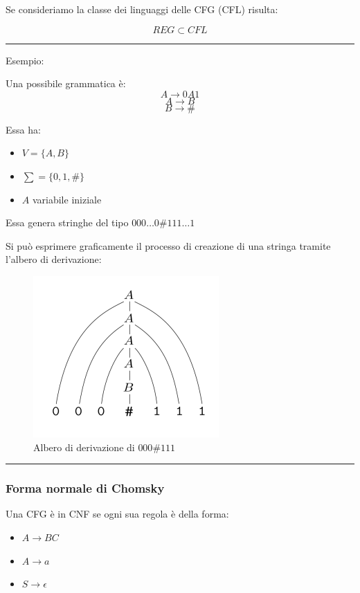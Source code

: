 \documentclass{article}
\begin{document}
\noindent Se consideriamo la classe dei linguaggi delle CFG (CFL) risulta:

$$REG\subset CFL$$

\noindent\rule{\textwidth}{0.5pt}\newline

\noindent Esempio:\newline

\noindent Una possibile grammatica è:
$$A\rightarrow0A1$$
$$A\rightarrow B$$
$$B\rightarrow\#$$

\noindent Essa ha:
\begin{itemize}
    \item $V=\{A,B\}$
    \item $\sum=\{0,1,\#\}$
    \item $A$ variabile iniziale\newline
\end{itemize}

\noindent Essa genera stringhe del tipo $000\ldots0\#111\ldots1$\newline

\noindent Si può esprimere graficamente il processo di creazione di una stringa tramite l'albero di derivazione:

\begin{figure}[ht]
    \centering
    \includegraphics[width=0.4\linewidth]{der_tree.png}
    \caption{Albero di derivazione di $000\#111$}
    \label{fig:der_tree}
\end{figure}

\vspace{-10pt}

\noindent\rule{\textwidth}{0.5pt}\newline

\subsubsection{Forma normale di Chomsky}

Una CFG è in CNF se ogni sua regola è della forma:
\begin{itemize}
    \item $A\rightarrow BC$
    \item $A\rightarrow a$
    \item $S\rightarrow\epsilon$\newline
\end{itemize}
\end{document}

